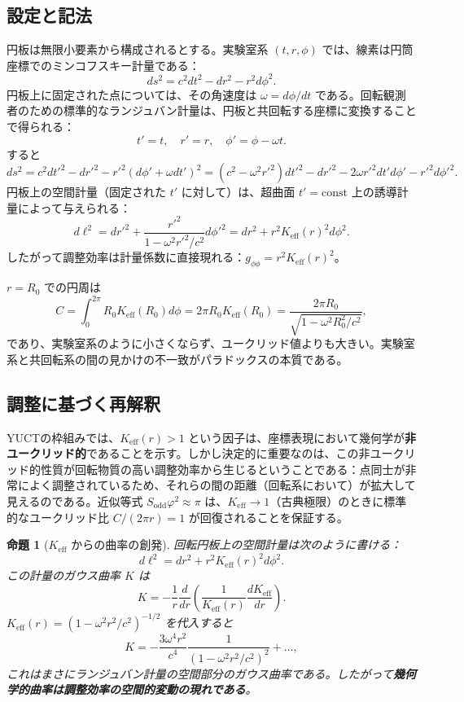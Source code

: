 \documentclass[12pt,a4paper]{article}
\newtheorem{proposition}{命題}[section]
\newcommand{\Sodd}{S_{\mathrm{odd}}}
\begin{document}
	\subsection{設定と記法}
	円板は無限小要素から構成されるとする。実験室系 \((t, r, \phi)\) では、線素は円筒座標でのミンコフスキー計量である：
	\[
	ds^2 = c^2 dt^2 - dr^2 - r^2 d\phi^2.
	\]
	円板上に固定された点については、その角速度は \(\omega = d\phi/dt\) である。回転観測者のための標準的なランジュバン計量は、円板と共回転する座標に変換することで得られる：
	\[
	t' = t,\quad r' = r,\quad \phi' = \phi - \omega t.
	\]
	すると
	\[
	ds^2 = c^2 dt'^2 - dr'^2 - r'^2 (d\phi' + \omega dt')^2 = (c^2 - \omega^2 r'^2) dt'^2 - dr'^2 - 2\omega r'^2 dt' d\phi' - r'^2 d\phi'^2.
	\]
	円板上の空間計量（固定された \(t'\) に対して）は、超曲面 \(t' = \text{const}\) 上の誘導計量によって与えられる：
	\[
	d\ell^2 = dr'^2 + \frac{r'^2}{1 - \omega^2 r'^2/c^2} d\phi'^2 = dr^2 + r^2 K_{\mathrm{eff}}(r)^2 d\phi^2.
	\]
	したがって調整効率は計量係数に直接現れる：\(g_{\phi\phi} = r^2 K_{\mathrm{eff}}(r)^2\)。
	
	\(r = R_0\) での円周は
	\[
	C = \int_0^{2\pi} R_0 K_{\mathrm{eff}}(R_0) d\phi = 2\pi R_0 K_{\mathrm{eff}}(R_0) = \frac{2\pi R_0}{\sqrt{1 - \omega^2 R_0^2/c^2}},
	\]
	であり、実験室系のように小さくならず、ユークリッド値よりも大きい。実験室系と共回転系の間の見かけの不一致がパラドックスの本質である。
	
	\subsection{調整に基づく再解釈}
	YUCTの枠組みでは、\(K_{\mathrm{eff}}(r) > 1\) という因子は、座標表現において幾何学が\textbf{非ユークリッド的}であることを示す。しかし決定的に重要なのは、この非ユークリッド的性質が回転物質の高い調整効率から生じるということである：点同士が非常によく調整されているため、それらの間の距離（回転系において）が拡大して見えるのである。近似等式 \(\Sodd \varphi^2 \approx \pi\) は、\(K_{\mathrm{eff}} \to 1\)（古典極限）のときに標準的なユークリッド比 \(C/(2\pi r) = 1\) が回復されることを保証する。
	
	\begin{proposition}[\(K_{\mathrm{eff}}\) からの曲率の創発]
		回転円板上の空間計量は次のように書ける：
		\[
		d\ell^2 = dr^2 + r^2 K_{\mathrm{eff}}(r)^2 d\phi^2.
		\]
		この計量のガウス曲率 \(K\) は
		\[
		K = -\frac{1}{r} \frac{d}{dr}\left( \frac{1}{K_{\mathrm{eff}}(r)} \frac{dK_{\mathrm{eff}}}{dr} \right).
		\]
		\(K_{\mathrm{eff}}(r) = (1 - \omega^2 r^2/c^2)^{-1/2}\) を代入すると
		\[
		K = -\frac{3\omega^4 r^2}{c^4} \frac{1}{(1 - \omega^2 r^2/c^2)^2} + \dots,
		\]
		これはまさにランジュバン計量の空間部分のガウス曲率である。したがって\textbf{幾何学的曲率は調整効率の空間的変動の現れである}。
	\end{proposition}
	
\end{document}
